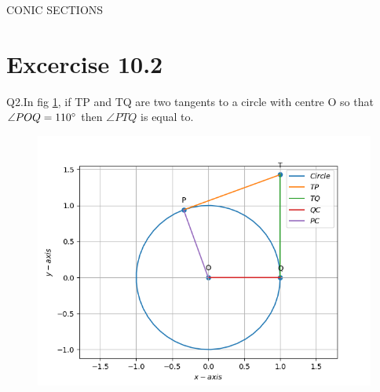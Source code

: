 \documentclass[12pt]{article}
\begin{document}
\begin{center}
\textbf\large{CONIC SECTIONS}

\end{center}
\section*{Excercise 10.2}
Q2.In fig \ref{fig:Fig1}, if TP and TQ are two tangents to a circle with centre O so that $\angle{POQ} = 110\degree$ then $\angle{PTQ}$ is equal to.
\begin{figure}[!h]
	\begin{center} 
	    \includegraphics[width=\columnwidth]{figs/tan2}
	\end{center}
\caption{}
\label{fig:Fig1}
\end{figure}
\end{document}
